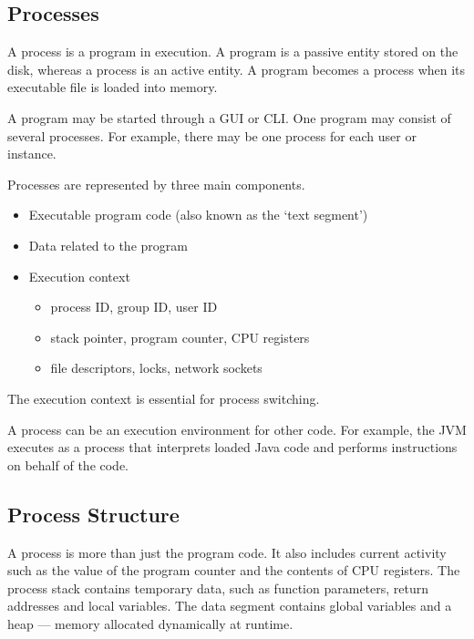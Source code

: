 \subsection{Processes}

A process is a program in execution.
A program is a passive entity stored on the disk, whereas a process is an active entity.
A program becomes a process when its executable file is loaded into memory.

A program may be started through a GUI or CLI.
One program may consist of several processes.
For example, there may be one process for each user or instance.

Processes are represented by three main components.
\begin{itemize}
  \item Executable program code (also known as the `text segment')
  \item Data related to the program
  \item Execution context
  \begin{itemize}
    \item process ID, group ID, user ID
    \item stack pointer, program counter, CPU registers
    \item file descriptors, locks, network sockets
  \end{itemize}
\end{itemize}
The execution context is essential for process switching.

A process can be an execution environment for other code.
For example, the JVM executes as a process that interprets loaded Java code and performs instructions on behalf of the code.

\subsection{Process Structure}

A process is more than just the program code.
It also includes current activity such as the value of the program counter and the contents of CPU registers.
The process stack contains temporary data, such as function parameters, return addresses and local variables.
The data segment contains global variables and a heap --- memory allocated dynamically at runtime.

